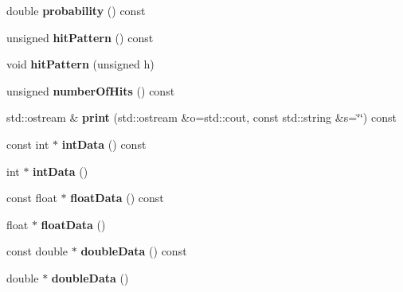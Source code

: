 \begin{DoxyCompactItemize}
\item 
double {\bfseries probability} () const \label{classTBTrack_1_1TrackFitResult_aba9d5aa99ef6d3c0c7c767f63e21191a}

\item 
unsigned {\bfseries hit\-Pattern} () const \label{classTBTrack_1_1TrackFitResult_ad1988c2b480b8d45d9b92e6643a8f2b9}

\item 
void {\bfseries hit\-Pattern} (unsigned h)\label{classTBTrack_1_1TrackFitResult_ac5b77c597472fbcf86b440940dbffc75}

\item 
unsigned {\bfseries number\-Of\-Hits} () const \label{classTBTrack_1_1TrackFitResult_a1911052615673f6341b65b4e874a7725}

\item 
std\-::ostream \& {\bfseries print} (std\-::ostream \&o=std\-::cout, const std\-::string \&s=\char`\"{}\char`\"{}) const \label{classTBTrack_1_1TrackFitResult_af6cc54a8c28eed7faf1a25680619c74e}

\item 
const int $\ast$ {\bfseries int\-Data} () const \label{classTBTrack_1_1TrackFitResult_ad008025d62102edd1b766bcda8fca9d8}

\item 
int $\ast$ {\bfseries int\-Data} ()\label{classTBTrack_1_1TrackFitResult_a9f6a52850d0d7fccf2fa679fefb156f9}

\item 
const float $\ast$ {\bfseries float\-Data} () const \label{classTBTrack_1_1TrackFitResult_af915d2a26e54410317c50e52072352a4}

\item 
float $\ast$ {\bfseries float\-Data} ()\label{classTBTrack_1_1TrackFitResult_acb8d400156d3413b0e1062530b87ecc9}

\item 
const double $\ast$ {\bfseries double\-Data} () const \label{classTBTrack_1_1TrackFitResult_a91f32c7b577a192a2a97e645fec1c83c}

\item 
double $\ast$ {\bfseries double\-Data} ()\label{classTBTrack_1_1TrackFitResult_a362625e95ba94f5de728a2cb3042c0cb}

\end{DoxyCompactItemize}
